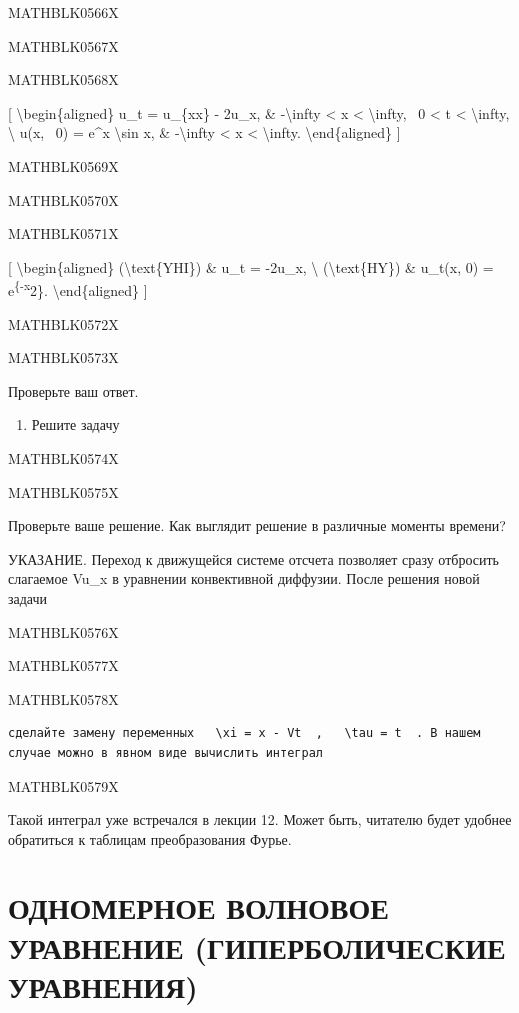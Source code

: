 \documentclass[
]{article}
\providecommand{\tightlist}{%
  \setlength{\itemsep}{0pt}\setlength{\parskip}{0pt}}
\begin{document}
MATHBLK0566X

MATHBLK0567X

MATHBLK0568X

{[} \textbackslash begin\{aligned\} u\_t = u\_\{xx\} - 2u\_x, \&
-\textbackslash infty \textless{} x \textless{} \textbackslash infty, ~0
\textless{} t \textless{} \textbackslash infty, \textbackslash{} u(x,
~0) = e\^{}x \textbackslash sin x, \& -\textbackslash infty \textless{}
x \textless{} \textbackslash infty. \textbackslash end\{aligned\} {]}

MATHBLK0569X

MATHBLK0570X

MATHBLK0571X

{[} \textbackslash begin\{aligned\} (\textbackslash text\{YHI\}) \& u\_t
= -2u\_x, \textbackslash{} (\textbackslash text\{HY\}) \& u\_t(x, 0) =
e\textsuperscript{\{-x}2\}. \textbackslash end\{aligned\} {]}

MATHBLK0572X

MATHBLK0573X

Проверьте ваш ответ.

\begin{enumerate}
\def\labelenumi{\arabic{enumi}.}
\setcounter{enumi}{3}
\tightlist
\item
  Решите задачу
\end{enumerate}

MATHBLK0574X

MATHBLK0575X

Проверьте ваше решение. Как выглядит решение в различные моменты
времени?

УКАЗАНИЕ. Переход к движущейся системе отсчета позволяет сразу отбросить
слагаемое Vu\_x в уравнении конвективной диффузии. После решения новой
задачи

MATHBLK0576X

MATHBLK0577X

MATHBLK0578X

\begin{verbatim}
сделайте замену переменных   \xi = x - Vt  ,   \tau = t  . В нашем случае можно в явном виде вычислить интеграл
\end{verbatim}

MATHBLK0579X

Такой интеграл уже встречался в лекции 12. Может быть, читателю будет
удобнее обратиться к таблицам преобразования Фурье.

\section{ОДНОМЕРНОЕ ВОЛНОВОЕ УРАВНЕНИЕ (ГИПЕРБОЛИЧЕСКИЕ
УРАВНЕНИЯ)}\label{ux43eux434ux43dux43eux43cux435ux440ux43dux43eux435-ux432ux43eux43bux43dux43eux432ux43eux435-ux443ux440ux430ux432ux43dux435ux43dux438ux435-ux433ux438ux43fux435ux440ux431ux43eux43bux438ux447ux435ux441ux43aux438ux435-ux443ux440ux430ux432ux43dux435ux43dux438ux44f}
\end{document}
